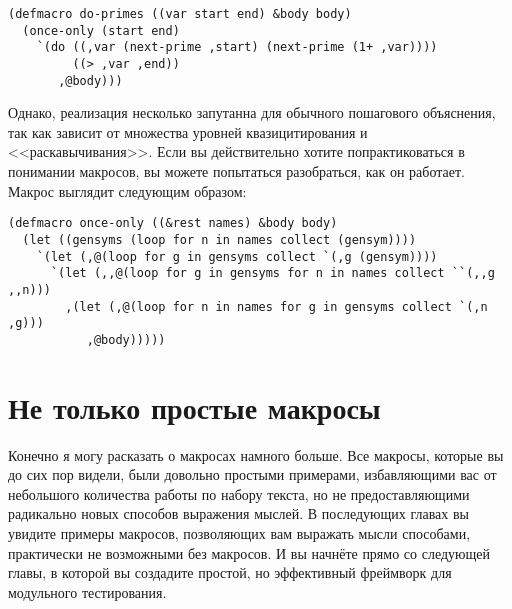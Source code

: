 \begin{lstlisting}
(defmacro do-primes ((var start end) &body body)
  (once-only (start end)
    `(do ((,var (next-prime ,start) (next-prime (1+ ,var))))
         ((> ,var ,end))
       ,@body)))
\end{lstlisting}

Однако, реализация  несколько запутанна для обычного пошагового
объяснения, так как зависит от множества уровней квазицитирования и <<раскавычивания>>. Если
вы действительно хотите попрактиковаться в понимании макросов, вы можете попытаться
разобраться, как он работает. Макрос выглядит следующим образом:

\begin{lstlisting}
(defmacro once-only ((&rest names) &body body)
  (let ((gensyms (loop for n in names collect (gensym))))
    `(let (,@(loop for g in gensyms collect `(,g (gensym))))
      `(let (,,@(loop for g in gensyms for n in names collect ``(,,g ,,n)))
        ,(let (,@(loop for n in names for g in gensyms collect `(,n ,g)))
           ,@body)))))
\end{lstlisting}

\section{Не только простые макросы}

Конечно я могу расказать о макросах намного больше. Все макросы, которые вы до сих пор
видели, были довольно простыми примерами, избавляющими вас от небольшого количества работы
по набору текста, но не предоставляющими радикально новых способов выражения мыслей. В
последующих главах вы увидите примеры макросов, позволяющих вам выражать мысли способами,
практически не возможными без макросов. И вы начнёте прямо со следующей главы, в которой
вы создадите простой, но эффективный фреймворк для модульного тестирования.

